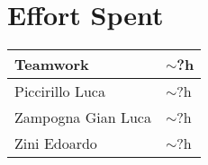 \section{Effort Spent}
\begin{tabular}{| p{5cm} | p{5cm} |}
\hline
Teamwork & $\sim$?h\\
\hline
Piccirillo Luca & $\sim$?h\\
\hline
Zampogna Gian Luca & $\sim$?h\\
\hline
Zini Edoardo & $\sim$?h\\
\hline
\end{tabular}